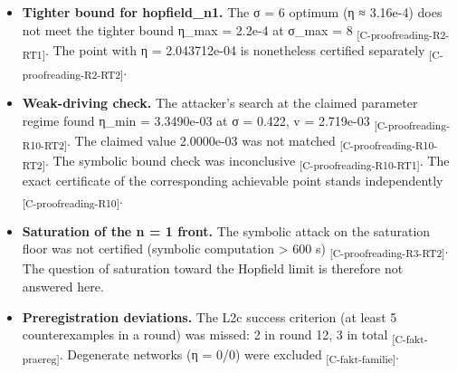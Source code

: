 \documentclass[
  english,
  twocolumn,
  10pt]{article}
\providecommand{\tightlist}{%
  \setlength{\itemsep}{0pt}\setlength{\parskip}{0pt}}
\begin{document}
\begin{itemize}
  \begin{itemize}
  \tightlist
  \item
    The symbolic attack that η ≥ 1.2·\(e^{-2\Delta}\) holds for all
    rates failed (coefficients not all nonnegative), as expected given
    the certified point of Theorem F
    \textsubscript{[C-proofreading-R8-RT1]}. The attacker's own search
    found η\_min = 1.0962e-04 at σ = 0.090, v = 6.296e-08, against a
    claimed 1.2500e-04 \textsubscript{[C-proofreading-R8-RT2]}.
  \item
    For n = 2, the attacker's search found η\_min = 3.1387e-05 at σ =
    2665.585, v = 2.037e-06, and did not reach the claimed 1.0000e-07
    \textsubscript{[C-proofreading-R9-RT2]}.
  \item
    Attacks on fam2\_9, fam2\_11 and fam2\_13 found the bound unprovable
    for them, consistent with counterexamples
    \textsubscript{[C-proofreading-R12-RT1]}.
  \end{itemize}
\item
  \textbf{Tighter bound for hopfield\_n1.} The σ = 6 optimum (η ≈
  3.16e-4) does not meet the tighter bound η\_max = 2.2e-4 at σ\_max = 8
  \textsubscript{[C-proofreading-R2-RT1]}. The point with η =
  2.043712e-04 is nonetheless certified separately
  \textsubscript{[C-proofreading-R2-RT2]}.
\item
  \textbf{Weak-driving check.} The attacker's search at the claimed
  parameter regime found η\_min = 3.3490e-03 at σ = 0.422, v = 2.719e-03
  \textsubscript{[C-proofreading-R10-RT2]}. The claimed value 2.0000e-03
  was not matched \textsubscript{[C-proofreading-R10-RT2]}. The symbolic
  bound check was inconclusive \textsubscript{[C-proofreading-R10-RT1]}.
  The exact certificate of the corresponding achievable point stands
  independently \textsubscript{[C-proofreading-R10]}.
\item
  \textbf{Saturation of the n = 1 front.} The symbolic attack on the
  saturation floor was not certified (symbolic computation
  \textgreater{} 600 s) \textsubscript{[C-proofreading-R3-RT2]}. The
  question of saturation toward the Hopfield limit is therefore not
  answered here.
\item
  \textbf{Preregistration deviations.} The L2c success criterion (at
  least 5 counterexamples in a round) was missed: 2 in round 12, 3 in
  total \textsubscript{[C-fakt-praereg]}. Degenerate networks (η = 0/0)
  were excluded \textsubscript{[C-fakt-familie]}.
\end{itemize}
\end{document}
